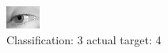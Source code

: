 \begin{figure}[h!]
\begin{center}
\includegraphics[width=0.60\columnwidth]{figures/ID2886_class_3_target_4.png}
\end{center}
\caption{ Classification: 3 actual target: 4}
\label{fig:ID2886_class_3_target_4}
\end{figure}
